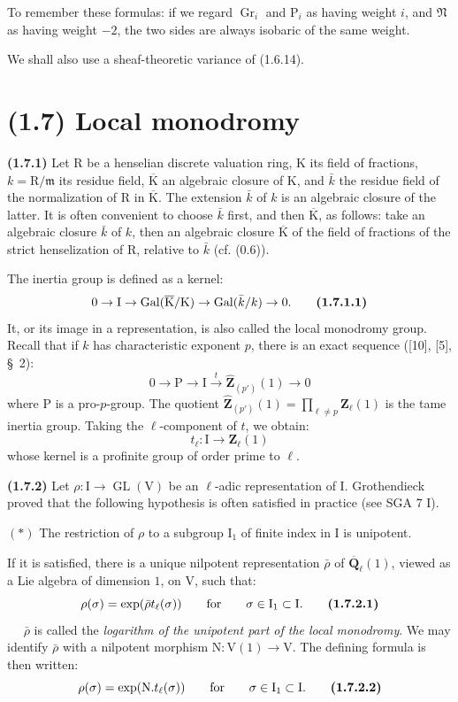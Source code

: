 \documentclass[11pt,leqno]{article}
\newcommand{\Page}[1]{\ifvmode\noindent\else\unskip\ \fi{\footnotesize\textcolor{gray}{[p.\,#1]}}\ \ignorespaces}
\begin{document}
To remember these formulas: if we regard \(\operatorname{Gr}_i\) and \(\mathrm{P}_i\) as having weight \(i\), and \(\mathfrak{N}\) as having weight \(-2\), the two sides are always isobaric of the same weight.

We shall also use a sheaf-theoretic variance of (1.6.14).

\section*{(1.7) Local monodromy}

\textbf{(1.7.1)} Let \(\mathrm{R}\) be a henselian discrete valuation ring, \(\mathrm{K}\) its field of fractions, \(k=\mathrm{R}/\mathfrak{m}\) its residue field, \(\overline{\mathrm{K}}\) an algebraic closure of \(\mathrm{K}\), and \(\bar{k}\) the residue field of the normalization of \(\mathrm{R}\) in \(\overline{\mathrm{K}}\). The extension \(\bar{k}\) of \(k\) is an algebraic closure of the latter. It is often convenient to choose \(\bar{k}\) first, and then \(\overline{\mathrm{K}}\), as follows: take an algebraic closure \(\bar{k}\) of \(k\), then an algebraic closure \(\overline{\mathrm{K}}\) of the field of fractions of the strict henselization of \(\mathrm{R}\), relative to \(\bar{k}\) (cf. (0.6)).

The inertia group is defined as a kernel:
\[
0\to\mathrm{I}\to
\operatorname{Gal}(\overline{\mathrm{K}}/\mathrm{K})
\to\operatorname{Gal}(\bar{k}/k)\to0.
\tag*{\textbf{(1.7.1.1)}}
\]
It, or its image in a representation, is also called the local monodromy group. Recall that if \(k\) has characteristic exponent \(p\), there is an exact sequence ([10], [5], \S~2):
\[
0\to\mathrm{P}\to\mathrm{I}
\xrightarrow{t}\widehat{\mathbf{Z}}_{(p')}(1)\to0
\]
where \(\mathrm{P}\) is a pro-\(p\)-group. The quotient \(\widehat{\mathbf{Z}}_{(p')}(1)=\prod\limits_{\ell\neq p}\mathbf{Z}_\ell(1)\) is the tame inertia group. Taking the \(\ell\)-component of \(t\), we obtain:
\[
t_\ell:\mathrm{I}\to\mathbf{Z}_\ell(1)
\]
whose kernel is a profinite group of order prime to \(\ell\).

\textbf{(1.7.2)} Let \(\rho:\mathrm{I}\to\operatorname{GL}(\mathrm{V})\) be an \(\ell\)-adic representation of \(\mathrm{I}\). Grothendieck proved that the following hypothesis is often satisfied in practice (see SGA 7 I).

\((*)\) The restriction of \(\rho\) to a subgroup \(\mathrm{I}_1\) of finite index in \(\mathrm{I}\) is unipotent.

If it is satisfied, there is a unique nilpotent representation \(\bar{\rho}\) of \(\overline{\mathbf{Q}}_\ell(1)\), viewed as a Lie algebra of dimension \(1\), on \(\mathrm{V}\), such that:
\[
\rho(\sigma)=\exp(\bar{\rho}t_\ell(\sigma))
\qquad\text{for}\qquad\sigma\in\mathrm{I}_1\subset\mathrm{I}.
\tag*{\textbf{(1.7.2.1)}}
\]
\Page{171}
\(\bar{\rho}\) is called the \textit{logarithm of the unipotent part of the local monodromy}. We may identify \(\bar{\rho}\) with a nilpotent morphism \(\mathrm{N}:\mathrm{V}(1)\to\mathrm{V}\). The defining formula is then written:
\[
\rho(\sigma)=\exp(\mathrm{N}.t_\ell(\sigma))
\qquad\text{for}\qquad\sigma\in\mathrm{I}_1\subset\mathrm{I}.
\tag*{\textbf{(1.7.2.2)}}
\]
\end{document}
